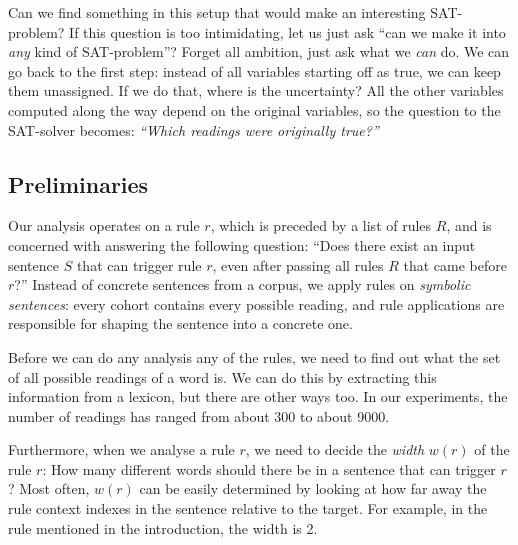 Can we find something in this setup that would make an interesting SAT-problem? 
If this question is too intimidating, let us just ask ``can we make it into \emph{any} kind of SAT-problem''? 
Forget all ambition, just ask what we \emph{can} do.
We can go back to the first step: instead of all variables starting off as true, we can keep them unassigned. If we do that, where is the uncertainty?
All the other variables computed along the way depend on the original variables, so the question to the SAT-solver becomes: \emph{``Which readings were originally true?''}






\subsection{Preliminaries}

Our analysis operates on a rule $r$, which is preceded by a list of rules $R$, and is concerned with answering the following question: ``Does there exist an input sentence $S$ that can trigger rule $r$, even after passing all rules $R$ that came before $r$?''
Instead of concrete sentences from a corpus, we apply rules on {\em symbolic sentences}:
every cohort contains every possible reading, and rule applications are responsible for shaping the sentence into a concrete one.

Before we can do any analysis any of the rules, we need to find out what the set of all possible readings of a word is. We can do this by extracting this information from a lexicon, but there are other ways too. In our experiments, the number of readings has ranged from about 300 to about 9000. 

Furthermore, when we analyse a rule $r$, we need to decide the {\em width} $w(r)$ of the rule $r$: How many different words should there be in a sentence that can trigger $r$? Most often, $w(r)$ can be easily determined by looking at how far away the rule context indexes in the sentence relative to the target. For example, in the rule mentioned in the introduction, the width is 2.

